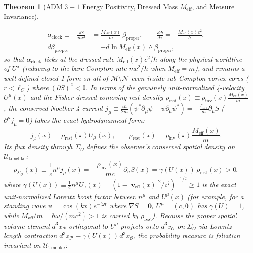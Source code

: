 \documentclass[11pt, a4paper]{article}
\newtheorem{theorem}{Theorem}[section]
\theoremstyle{definition}
\begin{document}
\begin{theorem}[ADM $3+1$ Energy Positivity, Dressed Mass $M_{\text{eff}}$, and Measure Invariance]
\begin{enumerate}[label=(\roman*)]
\begin{equation}
\begin{aligned}
    \alpha_{\text{clock}} \equiv -\frac{dS}{mc^2} &= \frac{M_{\text{eff}}(x)}{m}\,\beta_{\text{proper}}, \qquad \frac{d\Phi}{d\tau} = -\frac{M_{\text{eff}}(x) c^2}{\hbar}, \\
    d\beta_{\text{proper}} &= -d\ln M_{\text{eff}}(x) \wedge \beta_{\text{proper}},
    \end{aligned}
    \end{equation}
    so that $\alpha_{\text{clock}}$ ticks at the dressed rate $M_{\text{eff}}(x)c^2/\hbar$ along the physical worldline of $U^\mu$ (reducing to the bare Compton rate $mc^2/\hbar$ when $M_{\text{eff}} = m$), and remains a well-defined closed 1-form on all of $\mathcal{M}\setminus\mathcal{N}$ even inside sub-Compton vortex cores ($r < \ell_C$) where $(\partial S)^2 < 0$. In terms of the genuinely unit-normalized 4-velocity $U^\mu(x)$ and the Fisher-dressed comoving rest density $\rho_{\text{rest}}(x) \equiv \rho_{\text{inv}}(x)\frac{M_{\text{eff}}(x)}{m}$, the conserved Noether 4-current $j_\mu \equiv \frac{i\hbar}{2m}(\psi^*\partial_\mu\psi - \psi\partial_\mu\psi^*) = -\frac{\rho_{\text{inv}}}{m}\partial_\mu S$ ($\partial^\mu j_\mu = 0$) takes the exact hydrodynamical form:
    \begin{equation}
    \label{eq:noether_current}
    j_\mu(x) = \rho_{\text{rest}}(x) U_\mu(x), \qquad \rho_{\text{rest}}(x) = \rho_{\text{inv}}(x)\frac{M_{\text{eff}}(x)}{m}.
    \end{equation}
    Its flux density through $\Sigma_{\mathcal{O}}$ defines the observer's conserved spatial density on $\mathcal{U}_{\text{timelike}}$:
    \begin{equation}
    \label{eq:jacobian_density}
    \rho_{\Sigma_{\mathcal{O}}}(x) \equiv \frac{1}{c} n^\mu j_\mu(x) = -\frac{\rho_{\text{inv}}(x)}{mc}\partial_n S(x) = \gamma(U(x)) \, \rho_{\text{rest}}(x) > 0,
    \end{equation}
    where $\gamma(U(x)) \equiv \frac{1}{c} n^\mu U_\mu(x) = \left(1 - |\mathbf{v}_{\text{eff}}(x)|^2/c^2\right)^{-1/2} \ge 1$ is the exact unit-normalized Lorentz boost factor between $n^\mu$ and $U^\mu(x)$ (for example, for a standing wave $\psi = \cos(kx)e^{-i\omega t}$ where $\nabla S = \mathbf{0}$, $U^\mu = (c, \mathbf{0})$ has $\gamma(U) = 1$, while $M_{\text{eff}}/m = \hbar\omega/(mc^2) > 1$ is carried by $\rho_{\text{rest}}$). Because the proper spatial volume element $d^3x_{\mathcal{P}}$ orthogonal to $U^\mu$ projects onto $d^3x_{\mathcal{O}}$ on $\Sigma_{\mathcal{O}}$ via Lorentz length contraction $d^3x_{\mathcal{P}} = \gamma(U(x))\,d^3x_{\mathcal{O}}$, the probability measure is foliation-invariant on $\mathcal{U}_{\text{timelike}}$:

\end{enumerate}
\end{theorem}
\end{document}

